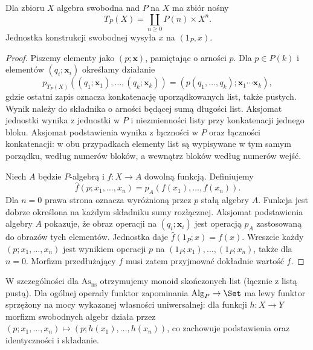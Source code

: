 \begin{twierdzenie}\label{cat:thm:free-operad-algebra}
Dla zbioru $X$ algebra swobodna nad $P$ na $X$ ma zbiór nośny
\[
 T_P(X)=\coprod_{n\geq0}P(n)\times X^n.
\]
Jednostka konstrukcji swobodnej wysyła $x$ na $(1_P,x)$.
\end{twierdzenie}
\begin{proof}
Piszemy elementy jako $(p;\mathbf x)$, pamiętając o arności $p$. Dla $p\in P(k)$ i elementów $(q_i;\mathbf x_i)$ określamy działanie
\[
 p_{T_P(X)}((q_1;\mathbf x_1),\ldots,(q_k;\mathbf x_k))
 =(p(q_1,\ldots,q_k);\mathbf x_1\cdots\mathbf x_k),
\]
gdzie ostatni zapis oznacza konkatenację uporządkowanych list, także pustych. Wynik należy do składnika o arności będącej sumą długości list. Aksjomat jednostki wynika z jednostki w $P$ i niezmienności listy przy konkatenacji jednego bloku. Aksjomat podstawienia wynika z łączności w $P$ oraz łączności konkatenacji: w obu przypadkach elementy list są wypisywane w tym samym porządku, według numerów bloków, a wewnątrz bloków według numerów wejść.

Niech $A$ będzie $P$-algebrą i $f:X\to A$ dowolną funkcją. Definiujemy
\[
 \widehat f(p;x_1,\ldots,x_n)=p_A(f(x_1),\ldots,f(x_n)).
\]
Dla $n=0$ prawa strona oznacza wyróżnioną przez $p$ stałą algebry $A$. Funkcja jest dobrze określona na każdym składniku sumy rozłącznej. Aksjomat podstawienia algebry $A$ pokazuje, że obraz operacji na $(q_i;\mathbf x_i)$ jest operacją $p_A$ zastosowaną do obrazów tych elementów. Jednostka daje $\widehat f(1_P;x)=f(x)$. Wreszcie każdy $(p;x_1,\ldots,x_n)$ jest wynikiem operacji $p$ na $(1_P;x_1),\ldots,(1_P;x_n)$, także dla $n=0$. Morfizm przedłużający $f$ musi zatem przyjmować dokładnie wartość $\widehat f$.
\end{proof}

W szczególności dla $\mathrm{As}_{\mathrm{ns}}$ otrzymujemy monoid skończonych list (łącznie z listą pustą). Dla ogólnej operady funktor zapominania $\operatorname{Alg}_P\to\Set$ ma lewy funktor sprzężony na mocy wykazanej własności uniwersalnej: dla funkcji $h:X\to Y$ morfizm swobodnych algebr działa przez $(p;x_1,\ldots,x_n)\mapsto(p;h(x_1),\ldots,h(x_n))$, co zachowuje podstawienia oraz identyczności i składanie.

